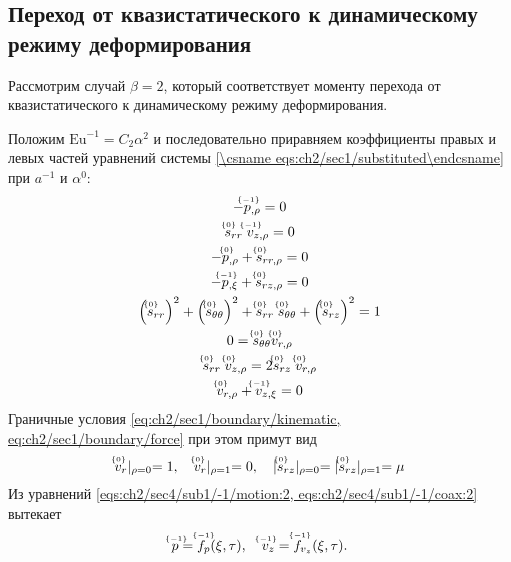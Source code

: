 \subsection{Переход от квазистатического к динамическому режиму деформирования}\label{subsec:ch2/sec4/sub1}

Рассмотрим случай $\beta=2$, который соответствует моменту перехода от квазистатического к динамическому режиму деформирования.

Положим $\text{Eu}^{-1} = C_2 \alpha^2$ и последовательно приравняем коэффициенты правых и левых частей уравнений системы \cref{\csname eqs:ch2/sec1/substituted\endcsname} при $a^{-1}$ и $\alpha^0$:
\begingroup
\allowdisplaybreaks
\label{eqs:ch2/sec4/sub1/main}
\begin{gather}
  \label{eqs:ch2/sec4/sub1/-1/motion:2}
  -\uindex{p}{-1}_{,\rho} = 0
  \\
  \label{eqs:ch2/sec4/sub1/-1/coax:2}
  \uindex{s}{0}_{rr} \; \uindex{v}{-1}_{z,\rho} = 0
  \\
  \label{eqs:ch2/sec4/sub1/0/motion:1}
  -\uindex{p}{0}_{,\rho}+\uindex{s}{0}_{rr,\rho} = 0
  \\
  \label{eqs:ch2/sec4/sub1/0/motion:2}
  -\uindex{p}{-1}_{,\xi} + \uindex{s}{0}_{rz,\rho} = 0
  \\
  \label{eqs:ch2/sec4/sub1/0/plasticity}
  \left(\uindex{s}{0}_{rr}\right)^2 + \left(\uindex{s}{0}_{\theta\theta}\right)^2 + \uindex{s}{0}_{rr}\; \uindex{s}{0}_{\theta\theta} + \left(\uindex{s}{0}_{rz}\right)^2 = 1
  \\
  \label{eqs:ch2/sec4/sub1/0/coax:1}
  0 = \uindex{s}{0}_{\theta\theta} \uindex{v}{0}_{r,\rho}
  \\
  \label{eqs:ch2/sec4/sub1/0/coax:2}
  \uindex{s}{0}_{rr} \; \uindex{v}{0}_{z,\rho} = 2 \uindex{s}{0}_{rz} \; \uindex{v}{0}_{r,\rho}
  \\
  \label{eqs:ch2/sec4/sub1/0/uncompress}
  \uindex{v}{0}_{r,\rho} + \uindex{v}{-1}_{z,\xi} = 0
\end{gather}
\endgroup
Граничные условия \cref{eq:ch2/sec1/boundary/kinematic, eq:ch2/sec1/boundary/force} при этом примут вид
\begin{equation}
  \label{eq:ch2/sec4/sub1/boundary/0}
  \uindex{v}{0}_{r}\lvert_{\rho=0} = 1,\quad \uindex{v}{0}_{r}\lvert_{\rho=1} = 0, \quad \lvert \uindex{s}{0}_{rz}\lvert_{\rho=0} = \lvert \uindex{s}{0}_{rz}\lvert_{\rho=1} = \mu
\end{equation}
Из уравнений \cref{eqs:ch2/sec4/sub1/-1/motion:2, eqs:ch2/sec4/sub1/-1/coax:2} вытекает
\begin{equation*}
  \uindex{p}{-1} = \uindex{f}{-1}_{p}(\xi, \tau), \quad \uindex{v}{-1}_{z} = \uindex{f}{-1}_{v_{z}}(\xi, \tau).
\end{equation*}
